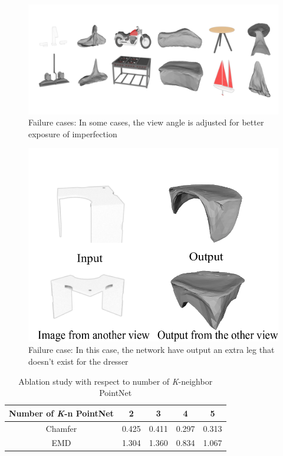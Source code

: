 \begin{figure}[htbp]
	\centering
	\includegraphics[width=\linewidth]{img/fail/fail1}
	\caption{Failure cases: In some cases, the view angle is adjusted for better exposure of imperfection}
	\label{fig:fail1}
\end{figure}
\begin{figure}[htbp]
	\centering
	\includegraphics[width=\linewidth]{img/fail/fail2}
	\caption{Failure case: In this case, the network have output an extra leg that doesn't exist for the dresser}
	\label{fig:fail2}
\end{figure}
\begin{table}
	\caption{Ablation study with respect to number of \textit{K}-neighbor PointNet}
	\label{tab:pointnet}
	\centering
	\begin{tabular}{c | c c c c}
		Number of \textit{K}-n PointNet &  2 & 3 & 4 & 5 \\
		\hline
		Chamfer      & 0.425 &  0.411 & 0.297 & 0.313 \\
		EMD			 & 1.304 &  1.360 & 0.834 & 1.067
	\end{tabular}
\end{table}



